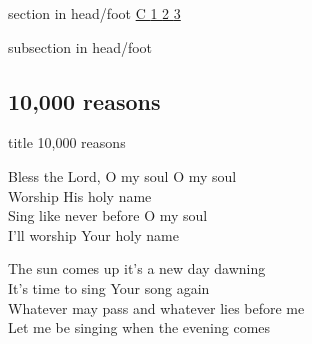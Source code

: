 \documentclass[aspectratio=169]{beamer}
\begin{document}
{
{ 
 {
 \begin{beamercolorbox}[ht=4.5ex,dp=1.5ex,%
      leftskip=.3cm,rightskip=.3cm plus1fil]{section in head/foot}
 \fontsize{12}{25}\selectfont 
\hyperlink{10,000 reasons['Bless the Lord, O my soul']C}{C  }\hyperlink{10,000 reasons['Bless the Lord, O my soul']1}{1  }\hyperlink{10,000 reasons['Bless the Lord, O my soul']2}{2  }\hyperlink{10,000 reasons['Bless the Lord, O my soul']3}{3  } 
 \end{beamercolorbox}%
  \begin{beamercolorbox}[ht=2.5ex,dp=1.125ex,%
   leftskip=.3cm,rightskip=.3cm plus1fil]{subsection in head/foot}
   \insertauthor
 \end{beamercolorbox}%
 }
}
\subsection{10,000 reasons}
\hypertarget{10,000 reasons['Bless the Lord, O my soul']}{}
\begin{frame}{}
 \vfill
  \centering
  \begin{beamercolorbox}[sep=8pt,center,shadow=true,rounded=true]{title}
    10,000 reasons     
  \end{beamercolorbox}
  \vfill
\end{frame}

\hypertarget{10,000 reasons['Bless the Lord, O my soul']C}{}
\begin{frame}{}
\fontsize{20.0}{24.0}\selectfont

Bless the Lord, O my soul O my soul\\ 
Worship His holy name\\ 
Sing like never before O my soul\\ 
I'll worship Your holy name

\end{frame}
\hypertarget{10,000 reasons['Bless the Lord, O my soul']1}{}
\begin{frame}{}
\fontsize{20.0}{24.0}\selectfont

The sun comes up it's a new day dawning\\ 
It's time to sing Your song again\\ 
Whatever may pass and whatever lies before me\\ 
Let me be singing when the evening comes


\end{frame}}
\end{document}
